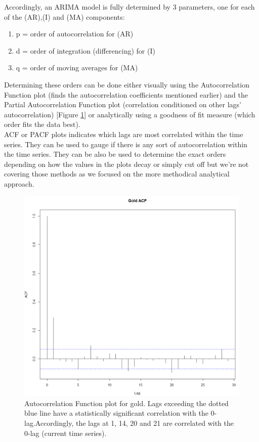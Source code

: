 Accordingly, an ARIMA model is fully determined by 3 parameters, one for each of the (AR),(I) and (MA) components: %
\begin{enumerate}
	\item p = order of autocorrelation for (AR)
	\item d = order of integration (differencing) for (I)
	\item q = order of moving averages for (MA)
\end{enumerate}
Determining these orders can be done either visually using the Autocorrelation Function plot (finds the autocorrelation coefficients mentioned earlier) and the Partial Autocorrelation Function plot (correlation conditioned on other lags' autocorrelation) [Figure \ref{fig:ACF}] or analytically using a goodness of fit measure (which order fits the data best).\\
ACF or PACF plots indicates which lags are most correlated within the time series. They can be used to gauge if there is any sort of autocorrelation within the time series. They can be also be used to determine the exact orders depending on how the values in the plots decay or simply cut off but we're not covering those methods as we focused on the more methodical analytical approach.\\
\begin{figure}[ht]
	\vskip 0.2in
	\begin{center}
		\centerline{\includegraphics[width=\columnwidth]{ACF.PNG}}
		\caption{Autocorrelation Function plot for gold. Lags exceeding the dotted blue line have a statistically significant correlation with the 0-lag.Accordingly, the lags at 1, 14, 20 and 21 are correlated with the 0-lag (current time series).}
	\end{center}
	\vskip -0.2in
	\label{fig:ACF}
\end{figure}
